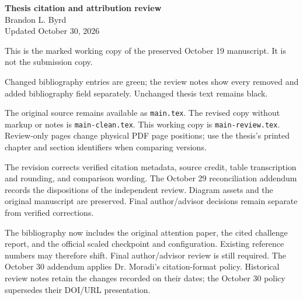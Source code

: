 \hypersetup{pageanchor=false}
\begin{titlepage}
\thispagestyle{empty}
\begin{center}
{\Large\bfseries Thesis citation and attribution review}\\[12pt]
Brandon L. Byrd\\
Updated October 30, 2026
\end{center}
\vspace{18pt}
This is the marked working copy of the preserved October 19 manuscript. It is not the submission copy.

  Changed bibliography entries are green; the review notes show every removed and added bibliography field separately. Unchanged thesis text remains black.

The original source remains available as \texttt{main.tex}. The revised copy without markup or notes is \texttt{main-clean.tex}. This working copy is \texttt{main-review.tex}. Review-only pages change physical PDF page positions; use the thesis's printed chapter and section identifiers when comparing versions.

The revision corrects verified citation metadata, source credit, table transcription and rounding, and comparison wording. The October 29 reconciliation addendum records the dispositions of the independent review. Diagram assets and the original manuscript are preserved. Final author/advisor decisions remain separate from verified corrections.

The bibliography now includes the original attention paper, the cited challenge report, and the official scaled checkpoint and configuration. Existing reference numbers may therefore shift. Final author/advisor review is still required.
The October 30 addendum applies Dr. Moradi's citation-format policy. Historical review notes retain the changes recorded on their dates; the October 30 policy supersedes their DOI/URL presentation.
\end{titlepage}
